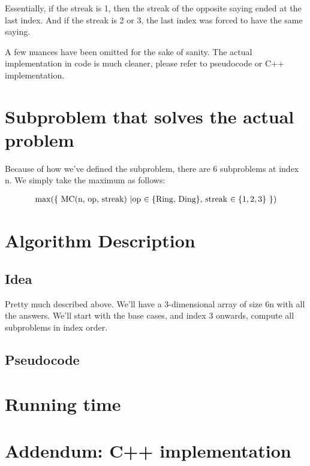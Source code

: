 \documentclass{article}
\begin{document}
Essentially, if the streak is 1, then the streak of the opposite saying ended at the last index. And if the streak is 2 or 3, the last index was forced to have the same saying. 

A few nuances have been omitted for the sake of sanity. The actual implementation in code is much cleaner, please refer to pseudocode or C++ implementation.

\section{Subproblem that solves the actual problem}

Because of how we've defined the subproblem, there are 6 subproblems at index n. We simply take the maximum as follows:

\begin{align*}
    \max(\{\text{ MC(n, op, streak) \textbar op $\in \{\text{Ring, Ding}\}$, streak $\in \{1,2,3\}$ }\})
\end{align*}

\section{Algorithm Description}
\subsection{Idea}
Pretty much described above. We'll have a 3-dimensional array of size 6n with all the answers. We'll start with the base cases, and index 3 onwards, compute all subproblems in index order.
\subsection{Pseudocode}
\section{Running time}

\section{Addendum: C++ implementation}
\inputminted{cpp}{/home/rachit/prog/a.cpp}
\end{document}
